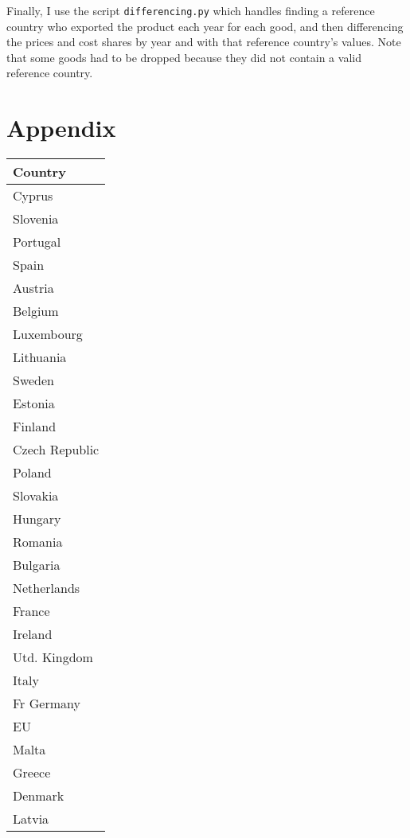\documentclass[12pt,a4paper]{article}                      %
\begin{document}
Finally, I use the script \texttt{differencing.py} which handles finding a reference country who exported the product each year for each good, and then differencing the prices and cost shares by year and with that reference country's values.  Note that some goods had to be dropped because they did not contain a valid reference country.





\newpage



\newpage

\section{Appendix}
\label{sec:appendix}

\begin{table}\label{tab:declarants}
    \begin{tabular}{|l|}
    \hline
    \textbf{Country}\\
    \hline
    \hline
    Cyprus\\
    \hline
    Slovenia\\
    \hline
    Portugal\\
    \hline
    Spain\\
    \hline
    Austria\\
    \hline
    Belgium\\
    \hline
    Luxembourg\\
    \hline
    Lithuania\\
    \hline
    Sweden\\
    \hline
    Estonia\\
    \hline
    Finland\\
    \hline
    Czech Republic\\
    \hline
    Poland\\
    \hline
    Slovakia\\
    \hline
    Hungary\\
    \hline
    Romania\\
    \hline
    Bulgaria\\
    \hline
    Netherlands\\
    \hline
    France\\
    \hline
    Ireland\\
    \hline
    Utd. Kingdom\\
    \hline
    Italy\\
    \hline
    Fr Germany\\
    \hline
    EU\\
    \hline
    Malta\\
    \hline
    Greece\\
    \hline
    Denmark\\
    \hline
    Latvia\\
    \hline
    \end{tabular}
\end{table}
\end{document}
